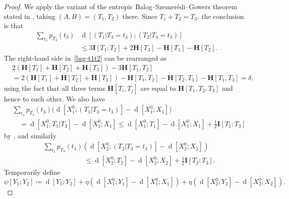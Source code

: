 \documentclass[12pt,reqno,tbtags]{amsart}
\theoremstyle{definition}
\theoremstyle{remark}
\renewcommand{\leq}{\leqslant}
\newcommand{\ent}[1]{\mathbf{H}[#1]}
\newcommand{\I}[1]{\mathbf{I}[#1]}
\newcommand{\dist}[2]{{\operatorname{d}[#1;#2]}} %
\numberwithin{equation}{section}
\begin{document}
\begin{proof}
We apply the variant of the entropic Balog--Szemer\'edi--Gowers theorem stated in , taking $(A,B) = (T_1, T_2)$ there.
Since $T_1 + T_2 = T_3$, the conclusion is that
\begin{align} \nonumber \sum_{t_3}p_{T_3}(t_3) & \dist{(T_1 | T_3 = t_3)}{(T_2 | T_3 = t_3)} \\ & \leq 3 \I{T_1 : T_2} + 2 \ent{T_3} - \ent{T_1} - \ent{T_2}.\label{bsg-t1t2}\end{align}
The right-hand side in~\eqref{bsg-t1t2} can be rearranged as
\begin{align*} & 2( \ent{T_1} + \ent{T_2} + \ent{T_3}) - 3 \ent{T_1,T_2} \\ & = 2(\ent{T_1} + \ent{T_2} + \ent{T_3}) - \ent{T_1,T_2} - \ent{T_2,T_3} - \ent{T_1, T_3} = \delta,\end{align*}
using the fact that all three terms $\ent{T_i,T_j}$ are equal to $\ent{T_1,T_2,T_3}$ and hence to each other.
We also have
\begin{align*}
&  \sum_{t_3}p_{T_3}(t_3) \bigl(\dist{X^0_1}{(T_1 | T_3=t_3)} - \dist{X^0_1}{X_1}\bigr) \\
&\quad = \dist{X^0_1}{T_1 | T_3} - \dist{X^0_1}{X_1} \leq \dist{X^0_1}{T_1} - \dist{X^0_1}{X_1} + \tfrac{1}{2} \I{T_1 : T_3}
\end{align*}
by , and similarly
\begin{align*}
&  \sum_{t_3}p_{T_3}(t_3) (\dist{X^0_2}{(T_2 | T_3=t_3)} - \dist{X^0_2}{X_2}) \\
&\quad\quad\quad\quad\quad\quad \leq \dist{X^0_2}{T_2} - \dist{X^0_2}{X_2} + \tfrac{1}{2} \I{T_2 : T_3}.
\end{align*}
Temporarily define
\[ \psi[Y_1; Y_2] \coloneqq \dist{Y_1}{Y_2} +  \eta (\dist{X_1^0}{Y_1} - \dist{X_1^0}{X_1}) + \eta(\dist{X_2^0}{Y_2} - \dist{X_2^0}{X_2}).\]


\end{proof}
\end{document}
